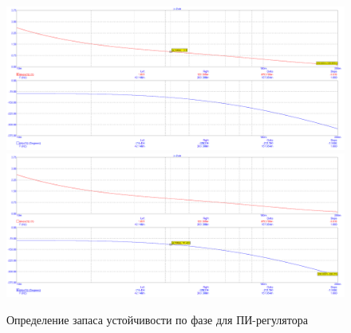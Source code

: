 	\begin{figure}[H]
		\centering
		\includegraphics[scale=0.35]{./images/11.png}
		\includegraphics[scale=0.35]{./images/12.png}
		\caption{Определение запаса устойчивости по фазе для ПИ-регулятора} 
	\end{figure}